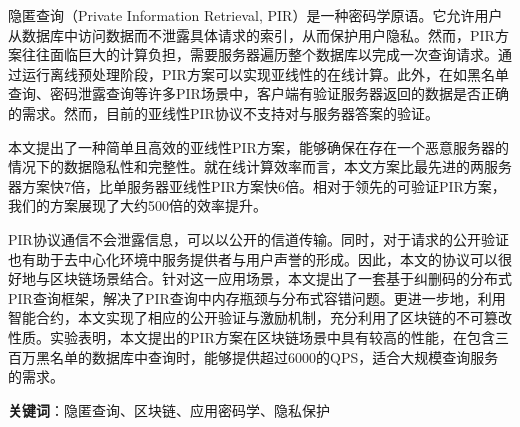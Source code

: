 \cleardoublepage
{}

隐匿查询（Private Information Retrieval, PIR）是一种密码学原语。它允许用户从数据库中访问数据而不泄露具体请求的索引，从而保护用户隐私。然而，PIR方案往往面临巨大的计算负担，需要服务器遍历整个数据库以完成一次查询请求。通过运行离线预处理阶段，PIR方案可以实现亚线性的在线计算。此外，在如黑名单查询、密码泄露查询等许多PIR场景中，客户端有验证服务器返回的数据是否正确的需求。然而，目前的亚线性PIR协议不支持对与服务器答案的验证。

本文提出了一种简单且高效的亚线性PIR方案，能够确保在存在一个恶意服务器的情况下的数据隐私性和完整性。就在线计算效率而言，本文方案比最先进的两服务器方案快7倍，比单服务器亚线性PIR方案快6倍。相对于领先的可验证PIR方案，我们的方案展现了大约500倍的效率提升。

PIR协议通信不会泄露信息，可以以公开的信道传输。同时，对于请求的公开验证也有助于去中心化环境中服务提供者与用户声誉的形成。因此，本文的协议可以很好地与区块链场景结合。针对这一应用场景，本文提出了一套基于纠删码的分布式PIR查询框架，解决了PIR查询中内存瓶颈与分布式容错问题。更进一步地，利用智能合约，本文实现了相应的公开验证与激励机制，充分利用了区块链的不可篡改性质。实验表明，本文提出的PIR方案在区块链场景中具有较高的性能，在包含三百万黑名单的数据库中查询时，能够提供超过6000的QPS，适合大规模查询服务的需求。

\bigskip
\noindent \textbf{关键词}：隐匿查询、区块链、应用密码学、隐私保护
\cleardoublepage
{}